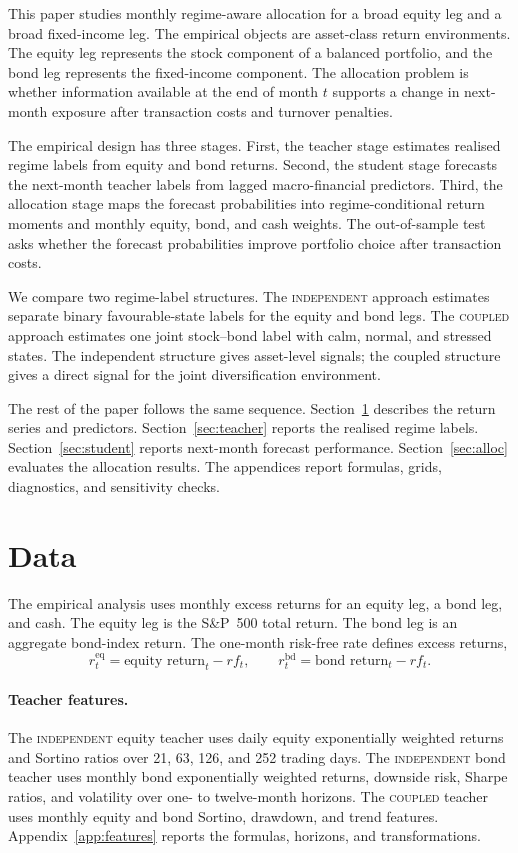 ﻿\documentclass[10pt]{article}
\newcommand{\Acoup}{\textsc{coupled}}
\newcommand{\Bindep}{\textsc{independent}}
\begin{document}
This paper studies monthly regime-aware allocation for a broad equity leg and a broad fixed-income leg. The empirical objects are asset-class return environments. The equity leg represents the stock component of a balanced portfolio, and the bond leg represents the fixed-income component. The allocation problem is whether information available at the end of month \(t\) supports a change in next-month exposure after transaction costs and turnover penalties.

The empirical design has three stages. First, the teacher stage
estimates realised regime labels from equity and bond returns. Second, the student stage
forecasts the next-month teacher labels from lagged macro-financial predictors. Third, the
allocation stage maps the forecast probabilities into regime-conditional return moments and
monthly equity, bond, and cash weights. The out-of-sample test asks whether the forecast
probabilities improve portfolio choice after transaction costs.

We compare two regime-label structures. The \Bindep{} approach estimates separate binary
favourable-state labels for the equity and bond legs. The \Acoup{} approach estimates one
joint stock--bond label with calm, normal, and stressed states. The independent structure
gives asset-level signals; the coupled structure gives a direct signal for the joint
diversification environment.

The rest of the paper follows the same sequence. Section~\ref{sec:data} describes the return
series and predictors. Section~\ref{sec:teacher} reports the realised regime labels.
Section~\ref{sec:student} reports next-month forecast performance. Section~\ref{sec:alloc}
evaluates the allocation results. The appendices report formulas, grids, diagnostics, and
sensitivity checks.

\section{Data}
\label{sec:data}

The empirical analysis uses monthly excess returns for an equity leg, a bond leg, and cash.
The equity leg is the S\&P~500 total return. The bond leg is an aggregate bond-index return.
The one-month risk-free rate defines excess returns,
\[
    r^{\mathrm{eq}}_t=\text{equity return}_t-rf_t,\qquad
    r^{\mathrm{bd}}_t=\text{bond return}_t-rf_t .
\]

\paragraph{Teacher features.}
The \Bindep{} equity teacher uses daily equity exponentially weighted returns and Sortino
ratios over 21, 63, 126, and 252 trading days. The \Bindep{} bond teacher uses monthly bond
exponentially weighted returns, downside risk, Sharpe ratios, and volatility over one- to
twelve-month horizons. The \Acoup{} teacher uses monthly equity and bond Sortino, drawdown,
and trend features. Appendix~\ref{app:features} reports the formulas, horizons, and
transformations.
\end{document}

